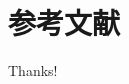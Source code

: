 \documentclass{beamer}
\begin{document}
\section{参考文献}

\begin{frame}[allowframebreaks]
    
    
\end{frame}

\begin{frame}
    \begin{center}
        {\Huge\calligra Thanks!}
    \end{center}
\end{frame}
\end{document}

